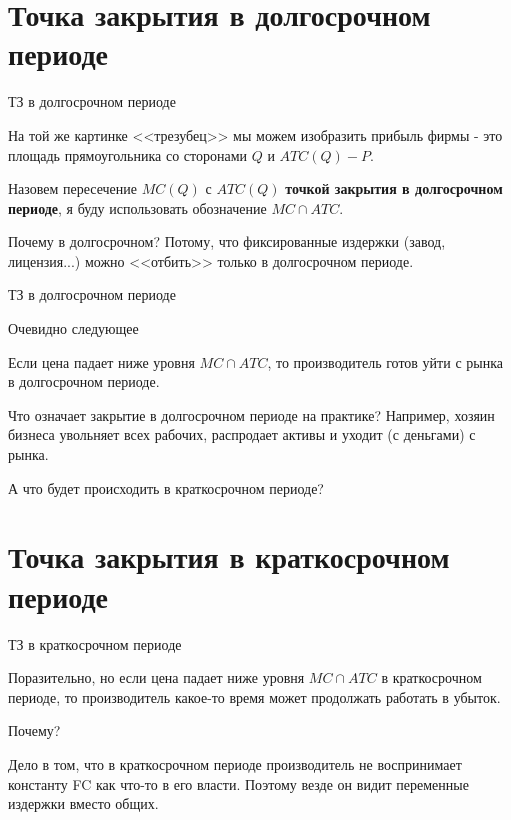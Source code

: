 \documentclass{beamer}
\begin{document}
\section{Точка закрытия в долгосрочном периоде}

\begin{frame}{ТЗ в долгосрочном периоде}

На той же картинке <<трезубец>> мы можем изобразить прибыль фирмы - это площадь прямоугольника со сторонами $Q$ и $ATC(Q)-P$. 

\begin{definition}
Назовем пересечение $MC(Q)$ с $ATC(Q)$ \textbf{точкой закрытия в долгосрочном периоде}, я буду использовать обозначение $MC \cap ATC$.
\end{definition}

Почему в долгосрочном? Потому, что фиксированные издержки (завод, лицензия...) можно <<отбить>> только в долгосрочном периоде. 

\end{frame}

\begin{frame}{ТЗ в долгосрочном периоде}

Очевидно следующее

\begin{lemma}
Если цена падает ниже уровня $MC \cap ATC$, то производитель готов уйти с рынка в долгосрочном периоде.
\end{lemma}

Что означает закрытие в долгосрочном периоде на практике? Например, хозяин бизнеса увольняет всех рабочих, распродает активы и уходит (с деньгами) с рынка.

А что будет происходить в краткосрочном периоде?

\end{frame}

\section{Точка закрытия в краткосрочном периоде}

\begin{frame}{ТЗ в краткосрочном периоде}

Поразительно, но если цена падает ниже уровня $MC \cap ATC$ в краткосрочном периоде, то производитель какое-то время может продолжать работать в убыток.

Почему?

Дело в том, что в краткосрочном периоде производитель не воспринимает константу FC как что-то в его власти. Поэтому везде он видит переменные издержки вместо общих.
\end{frame}
\end{document}
